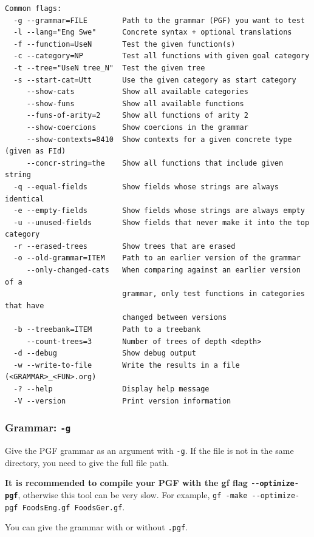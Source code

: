\begin{verbatim}
Common flags:
  -g --grammar=FILE        Path to the grammar (PGF) you want to test
  -l --lang="Eng Swe"      Concrete syntax + optional translations
  -f --function=UseN       Test the given function(s)
  -c --category=NP         Test all functions with given goal category
  -t --tree="UseN tree_N"  Test the given tree
  -s --start-cat=Utt       Use the given category as start category
     --show-cats           Show all available categories
     --show-funs           Show all available functions
     --funs-of-arity=2     Show all functions of arity 2
     --show-coercions      Show coercions in the grammar
     --show-contexts=8410  Show contexts for a given concrete type (given as FId)
     --concr-string=the    Show all functions that include given string
  -q --equal-fields        Show fields whose strings are always identical
  -e --empty-fields        Show fields whose strings are always empty
  -u --unused-fields       Show fields that never make it into the top category
  -r --erased-trees        Show trees that are erased
  -o --old-grammar=ITEM    Path to an earlier version of the grammar
     --only-changed-cats   When comparing against an earlier version of a
                           grammar, only test functions in categories that have
                           changed between versions
  -b --treebank=ITEM       Path to a treebank
     --count-trees=3       Number of trees of depth <depth>
  -d --debug               Show debug output
  -w --write-to-file       Write the results in a file (<GRAMMAR>_<FUN>.org)
  -? --help                Display help message
  -V --version             Print version information
\end{verbatim}

\hypertarget{grammar--g}{%
\subsubsection{\texorpdfstring{Grammar:
\texttt{-g}}{Grammar: -g}}\label{grammar--g}}

Give the PGF grammar as an argument with \texttt{-g}. If the file is not
in the same directory, you need to give the full file path.

\textbf{It is recommended to compile your PGF with the gf flag
\texttt{-\/-optimize-pgf}}, otherwise this tool can be very slow. For
example, \texttt{gf\ -make\ -\/-optimize-pgf\ FoodsEng.gf\ FoodsGer.gf}.

You can give the grammar with or without \texttt{.pgf}.

